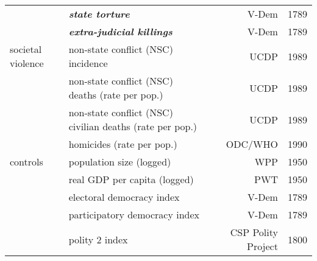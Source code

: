 \begin{table}[h]
\begin{tabular}{llrr}
                     & \textbf{\textit{state torture}}                          & V-Dem              & 1789 \\
                     & \textbf{\textit{extra-judicial killings}}                & V-Dem              & 1789 \\
societal violence    & non-state conflict (NSC) incidence                       & UCDP               & 1989 \\
                     & non-state conflict (NSC) deaths (rate per pop.)          & UCDP               & 1989 \\
                     & non-state conflict (NSC) civilian deaths (rate per pop.) & UCDP               & 1989 \\
                     & homicides (rate per pop.)                                & ODC/WHO            & 1990 \\
controls             & population size (logged)                                 & WPP                & 1950 \\
                     & real GDP per capita (logged)                             & PWT                & 1950 \\
                     & electoral democracy index                                & V-Dem              & 1789 \\
                     & participatory democracy index                            & V-Dem              & 1789 \\
                     & polity 2 index                                           & CSP Polity Project & 1800 \\
\bottomrule
\end{tabular}
\end{table}
